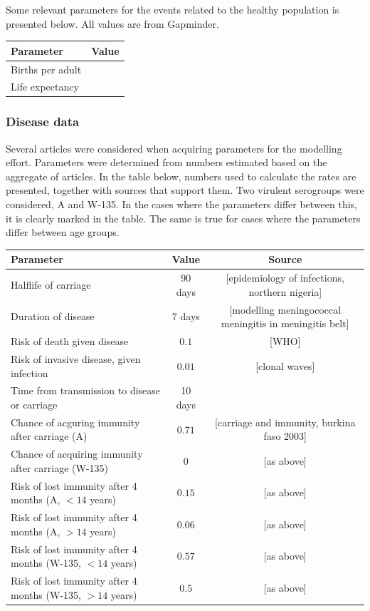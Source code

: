 \documentclass[10pt,a4paper]{article}
\begin{document}
Some relevant parameters for the events related to the healthy population is presented below. All values are from Gapminder.

\begin{tabular}{|l|c|}
	\hline
	Parameter			& Value \\ \hline
	Births per adult	&		\\
	Life expectancy		&
\end{tabular}

\subsubsection{Disease data}

Several articles were considered when acquiring parameters for the modelling effort. Parameters were determined from numbers estimated based on the aggregate of articles. In the table below, numbers used to calculate the rates are presented, together with sources that support them. Two virulent serogroups were considered, A and W-135. In the cases where the parameters differ between this, it is clearly marked in the table. The same is true for cases where the parameters differ between age groups.

\begin{tabular}{|l|c|c|}
	\hline
		Parameter 													& Value			& Source 														\\ \hline
		Halflife of carriage										& 90 days		& [epidemiology of infections, northern nigeria]				\\
		Duration of disease											& 7 days		& [modelling meningococcal meningitis in meningitis belt]		\\
		Risk of death given disease									& $0.1$			& [WHO]															\\
		Risk of invasive disease, given infection					& $0.01$		& [clonal waves]												\\
		Time from transmission to disease or carriage				& 10 days		&																\\
		Chance of acguring immunity after carriage (A)				& $0.71$		& [carriage and immunity, burkina faso 2003]					\\
		Chance of acquiring immunity after carriage (W-135)		& $0$			& [as above]													\\
		Risk of lost immunity after 4 months (A, $<14$ years)		& $0.15$		& [as above]													\\
		Risk of lost immunity after 4 months (A, $>14$ years)		& $0.06$		& [as above]													\\
		Risk of lost immunity after 4 months (W-135, $<14$ years)	& $0.57$		& [as above]													\\
		Risk of lost immunity after 4 months (W-135, $>14$ years)	& $0.5$			& [as above]													\\ \hline
\end{tabular}
\end{document}
